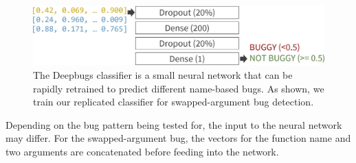 \begin{figure}[h]
    \centering
    \includegraphics[width=\linewidth]{images/deepbugs-nn.jpg}
    \caption{The Deepbugs classifier is a small neural network that can be rapidly retrained to predict different name-based bugs. As shown, we train our replicated classifier for swapped-argument bug detection.}
    \label{fig:deepbugs-nn}
\end{figure}

Depending on the bug pattern being tested for, the input to the neural network may differ. For the swapped-argument bug, the vectors for the function name and two arguments are concatenated before feeding into the network.









